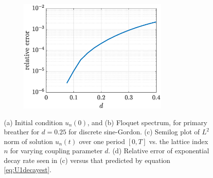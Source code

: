 \documentclass[12pt,reqno]{amsart}
\theoremstyle{definition}
\begin{document}
\begin{figure}
\begin{center}
\begin{subfigure}{0.45\linewidth}
		\caption{}
		\includegraphics[width=7.5cm]{singledecayerror.eps}
		\label{fig:singled}
	\end{subfigure}
	\end{center}
	\caption{(a) Initial condition $u_n(0)$, and (b) Floquet spectrum, for primary breather for $d = 0.25$ for discrete sine-Gordon. (c) Semilog plot of $L^2$ norm of solution $u_n(t)$ over one period $[0,T]$ vs. the lattice index $n$ for varying coupling parameter $d$. (d) Relative error of exponential decay rate seen in (c) versus that predicted by equation \cref{eq:U1decayest}. }
	\label{fig:single}
\end{figure}
\end{document}
